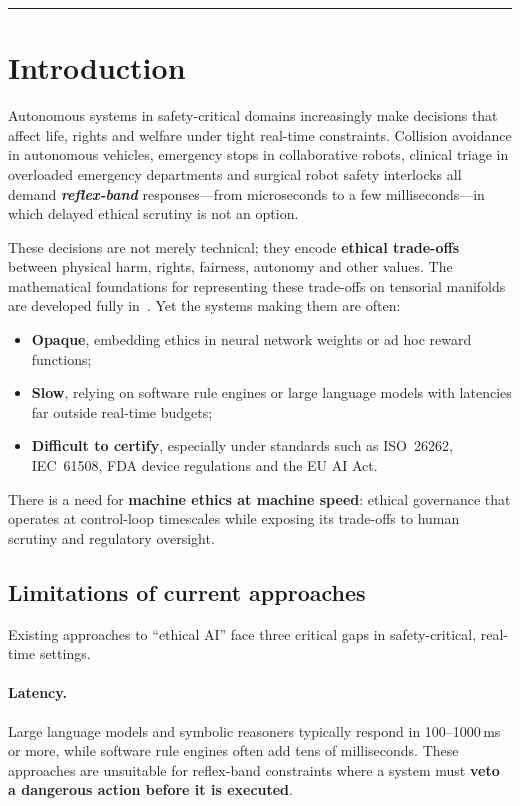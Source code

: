 \documentclass[11pt]{article}
\begin{document}
\hrule
\vspace{1em}

\section{Introduction}

Autonomous systems in safety-critical domains increasingly make decisions that affect life, rights and welfare under tight real-time constraints. Collision avoidance in autonomous vehicles, emergency stops in collaborative robots, clinical triage in overloaded emergency departments and surgical robot safety interlocks all demand \textbf{\emph{reflex-band}} responses---from microseconds to a few milliseconds---in which delayed ethical scrutiny is not an option.

These decisions are not merely technical; they encode \textbf{ethical trade-offs} between physical harm, rights, fairness, autonomy and other values. The mathematical foundations for representing these trade-offs on tensorial manifolds are developed fully in~\cite{bond2026ge}. Yet the systems making them are often:

\begin{itemize}
  \item \textbf{Opaque}, embedding ethics in neural network weights or ad hoc reward functions;
  \item \textbf{Slow}, relying on software rule engines or large language models with latencies far outside real-time budgets;
  \item \textbf{Difficult to certify}, especially under standards such as ISO~26262, IEC~61508, FDA device regulations and the EU AI Act.
\end{itemize}

There is a need for \textbf{machine ethics at machine speed}: ethical governance that operates at control-loop timescales while exposing its trade-offs to human scrutiny and regulatory oversight.

\subsection{Limitations of current approaches}

Existing approaches to ``ethical AI'' face three critical gaps in safety-critical, real-time settings.

\paragraph{Latency.}
Large language models and symbolic reasoners typically respond in 100--1000\,ms or more, while software rule engines often add tens of milliseconds. These approaches are unsuitable for reflex-band constraints where a system must \textbf{veto a dangerous action before it is executed}.
\end{document}
